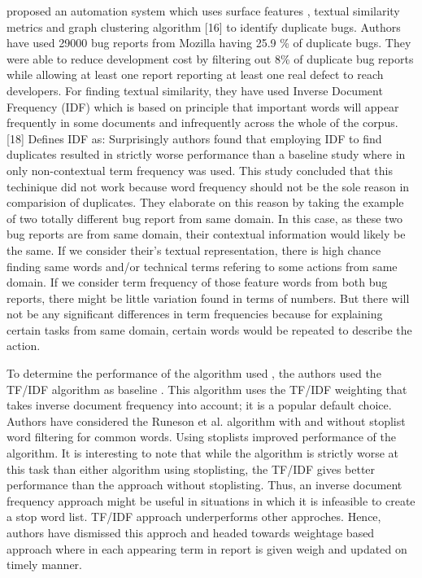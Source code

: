 \documentclass[]{sig-alternate-05-2015}
\begin{document}
\cite{Jalbert2008} proposed an automation system which uses surface features \cite{Hooimeijer2007}, textual similarity metrics \cite{Runeson2007} and graph clustering algorithm [16] to identify duplicate bugs. Authors have used 29000 bug reports from Mozilla having 25.9 \% of duplicate bugs. They were able to reduce development cost by filtering out 8\% of duplicate bug reports while allowing at least one report reporting at least one real defect to reach developers. For finding textual similarity, they have used Inverse Document Frequency (IDF) which is based on principle that important words will appear frequently in some documents and infrequently across the whole of the corpus. [18] Defines IDF as: Surprisingly authors found that employing IDF to find duplicates resulted in strictly worse performance than a baseline study where in only non-contextual term frequency was used. This study concluded that this techinique did not work because word frequency should not be the sole reason in comparision of duplicates. They elaborate on this reason by taking the example of two totally different bug report from same domain. In this case, as these two bug reports are from same domain, their contextual information would likely be the same. If we consider their’s textual representation, there is high chance finding same words and/or technical terms refering to some actions from same domain. If we consider term frequency of those feature words from both bug reports, there might be little variation found in terms of numbers. But there will not be any significant differences in term frequencies because for explaining certain tasks from same domain, certain words would be repeated to describe the action. \newline

To determine the performance of the algorithm used , the authors used the TF/IDF algorithm as baseline . This algorithm uses the TF/IDF weighting that takes inverse document frequency into account; it is a popular default choice. Authors have considered the Runeson et al. algorithm with and without stoplist word filtering for common words. Using stoplists improved performance of the algorithm. It is interesting to note that while the algorithm is strictly worse at this task than either algorithm using stoplisting, the TF/IDF gives better performance than the approach without stoplisting. Thus, an inverse document frequency approach might be useful in situations in which it is infeasible to create a stop word list. TF/IDF approach underperforms other approches. Hence, authors have dismissed this approch and headed towards weightage based approach where in each appearing term in report is given weigh and updated on timely manner. \newline
\end{document}
